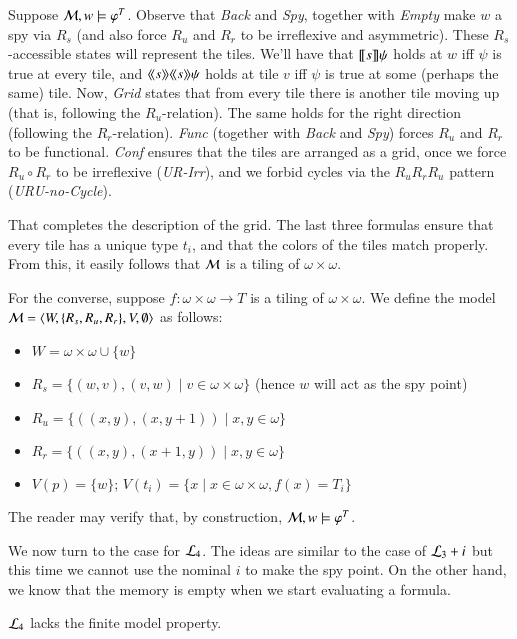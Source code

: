 \begin{pf}
Suppose $\mathcal{M},w\models\varphi^T$. Observe that \textit{Back} and
\textit{Spy}, together with \textit{Empty} make $w$ a spy
via $R_s$ (and also force
$R_u$ and $R_r$ to be irreflexive and asymmetric). These $R_s$-accessible
states will represent the tiles. We'll have that $[\![ s ]\!]\psi$
holds at $w$ iff $\psi$ is true at every tile, and
$\langle\!\langle s \rangle\!\rangle\langle\!\langle s \rangle\!\rangle\psi$ holds at tile $v$ iff $\psi$ is
true at some (perhaps the same) tile.
Now, \textit{Grid} states that from every tile there is
another tile moving up (that is, following the $R_u$-relation). The
same holds for the right direction (following the $R_r$-relation).
\textit{Func} (together with \textit{Back} and \textit{Spy}) forces $R_u$ and $R_r$ to be functional. \textit{Conf} ensures that
the tiles are arranged as a grid, once we force $R_u{\circ}R_r$ to be
irreflexive (\textit{UR-Irr}), and we forbid cycles via the $R_uR_rR_u$ pattern (\textit{URU-no-Cycle}).

That completes the description of the grid. The last
three formulas ensure that every tile has a unique type $t_i$, and that the
colors of the tiles match properly. From this, it easily follows
that $\mathcal{M}$ is a tiling of $\omega\times\omega$.

For the converse, suppose $f:\omega\times\omega\to T$ is a tiling of
$\omega\times\omega$. We define the model
$\mathcal{M}=\langle W,\{R_s,R_u,R_r\},V,\emptyset \rangle$ as follows:
\begin{itemize}
\item $W=\omega\times\omega \cup \{w\}$
\item $R_s=\{(w,v),(v,w)\mid v\in\omega\times\omega\}$  (hence $w$ will act as the spy
point)
\item $R_u=\{((x,y),(x,y+1))\mid x,y\in\omega\}$
\item $R_r=\{((x,y),(x+1,y))\mid x,y\in\omega\}$
\item $V(p)=\{w\}$; $V(t_i)=\{x\mid x\in\omega\times\omega, f(x)=T_i\}$
\end{itemize}
The reader may verify that, by construction,
$\mathcal{M},w\models\varphi^T$.
\end{pf}

We now turn to the case for $\mathcal{L}_4$. The ideas are similar to the case
of $\mathcal{L}_3 + i$ but this time we cannot use the nominal $i$ to make the
spy point.  On the other hand, we know that the memory is empty when we
start evaluating a formula.


\begin{thm}\label{thm:tlme:inf}
$\mathcal{L}_4$ lacks the finite model property.
\end{thm}

